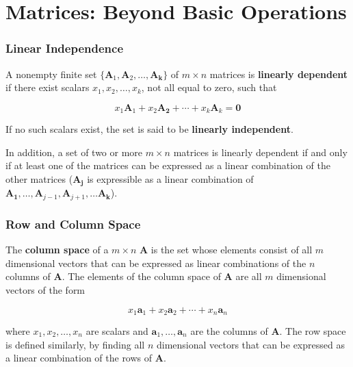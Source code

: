 \documentclass{beamer}
\begin{document}
\section{Matrices: Beyond Basic Operations}

\begin{frame}
\frametitle{Linear Independence}
A nonempty finite set $\{\mathbf{A}_1, \mathbf{A}_2, \hdots, \mathbf{A_k}\}$ of $m \times n$ matrices is \textbf{linearly dependent} if there exist scalars $x_1, x_2, \hdots, x_k$, not all equal to zero, such that

\[x_1\mathbf{A}_1 + x_2\mathbf{A_2} + \cdots + x_k\mathbf{A}_k = \mathbf{0}\]

If no such scalars exist, the set is said to be \textbf{linearly independent}. 
\vspace{5mm}

In addition, a set of two or more $m \times n$ matrices is linearly dependent if and only if at least one of the matrices can be expressed as a linear combination of the other matrices ($\mathbf{A_j}$ is expressible as a linear combination of $\mathbf{A_1}, \hdots, \mathbf{A}_{j-1}, \mathbf{A}_{j+1}, \hdots \mathbf{A_k}$).
\end{frame}

\begin{frame}
\frametitle{Row and Column Space}
The \textbf{column space} of a $m \times n$ $\mathbf{A}$ is the set whose elements consist of all $m$ dimensional vectors that can be expressed as linear combinations of the $n$ columns of $\mathbf{A}$.  The elements of the column space of $\mathbf{A}$ are all $m$ dimensional vectors of the form

\[x_1 \mathbf{a}_1 + x_2\mathbf{a}_2 + \cdots + 
x_n\mathbf{a}_n\]

where $x_1, x_2, \hdots, x_n$ are scalars and $\mathbf{a}_1, \hdots, \mathbf{a}_n$ are the columns of $\mathbf{A}$.  The row space is defined similarly, by finding all $n$ dimensional vectors that can be expressed as a linear combination of the rows of $\mathbf{A}$. 
\end{frame}
\end{document}
